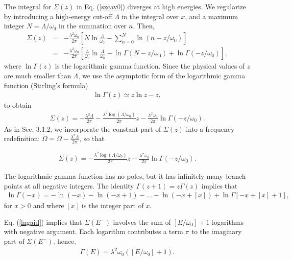 \documentclass[12pt]{article}
\numberwithin{equation}{section}
\begin{document}
 The integral for $\Sigma(z)$ in Eq. (\ref{szcav0}) diverges at high energies. We regularize by introducing a high-energy cut-off $\Lambda$ in the integral over $x$, and a maximum integer $N = \Lambda/\omega_0$ in the summation over $n$.  Then,
 \begin{eqnarray}
 \Sigma(z) &=& -\frac{\lambda^2 \omega_0}{2\pi} \left[ N \ln \frac{\Lambda}{\omega_0} - \sum_{n=0}^{N} \ln(n - z/\omega_0)\right]   \nonumber \\
 &=& -\frac{\lambda^2 \omega_0}{2\pi} \left[\frac{\Lambda}{\omega_0}  \ln \frac{\Lambda}{\omega_0} - \ln\Gamma(N - z/\omega_0) +  \ln\Gamma( -z/\omega_0) \right],
 \end{eqnarray}
 where $\ln\Gamma(z)$ is the logarithmic gamma function. Since the physical values of $z$ are much smaller than $\Lambda$,  we use the asymptotic form of the logarithmic gamma function (Stirling's formula)
 \begin{eqnarray}
   \ln\Gamma(z) \simeq z \ln z -z, \label{stirling}
 \end{eqnarray}
to obtain
\begin{eqnarray}
\Sigma(z) =  - \frac{\lambda^2\Lambda }{2\pi} -    \frac{\lambda^2\log (\Lambda/\omega_0) }{2\pi}z-  \frac{\lambda^2 \omega_0}{2\pi} \ln\Gamma( -z/\omega_0). \label{szcav}
\end{eqnarray}
 As in Sec. 3.1.2, we  incorporate the constant part of $\Sigma(z)$ into a frequency redefinition: $\tilde{\Omega} =  \Omega - \frac{\lambda^2\Lambda }{2\pi}$, so that

\begin{eqnarray}
\Sigma(z) =  - \frac{\lambda^2\log (\Lambda/\omega_0) }{2\pi}z  - \frac{\lambda^2 \omega_0}{2\pi} \ln\Gamma( -z/\omega_0). \label{szcav2}
\end{eqnarray}


The logarithmic gamma function has no poles, but it has infinitely many branch points at all negative integers. The identity $\Gamma(z+1) = z \Gamma(z)$ implies that
\begin{eqnarray}
\ln \Gamma(-x) = - \ln(-x) - \ln(-x+1) - \ldots - \ln(-x + [x]) +\ln\Gamma[-x+[x]+1], \label{lngaid}
\end{eqnarray}
for $x > 0$ and where $[x]$ is the integer part of $x$.

Eq. (\ref{lngaid}) implies that
 $\Sigma(E^-)$   involves the sum of  $[E/\omega_0]+1$ logarithms with negative argument. Each logarithm contributes a term $ \pi$ to the imaginary part of $\Sigma(E^-)$, hence,
\begin{eqnarray}
  \Gamma(E)  =  \lambda^2 \omega_0 ([E/\omega_0]+1).
\end{eqnarray}
\end{document}
